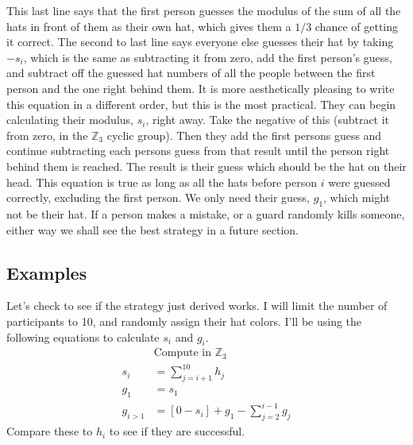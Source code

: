 \documentclass[10pt]{article}
\begin{document}
This last line says that the first person guesses the 
modulus of the sum of all the hats in front of them as their own hat, which 
gives them a $1/3$ chance of getting it correct. The second to last 
line says everyone else guesses their hat by taking $-s_i$, which is the same 
as subtracting it from zero, add the first person's guess, and subtract 
off the guessed hat numbers of all the people between the first person 
and the one right behind them. It is more aesthetically pleasing to 
write this equation in a different order, but this is the most practical. 
They can begin calculating their modulus, $s_i$, right away. Take the 
negative of this (subtract it from zero, in the $\mathbb{Z}_3$ 
cyclic group). Then they add the first persons guess and continue 
subtracting each persons guess from that result until 
the person right behind them is reached. The result is their guess which 
should be the hat on their head. This equation is true as long as all the 
hats before person $i$ were guessed correctly, excluding the first person. 
We only need their guess, $g_1$, which might not be their hat.
If a person makes a mistake, or a guard randomly kills 
someone, either way we shall see the best strategy in a future section. 

\subsection{Examples}

Let's check to see if the strategy just derived works. I will
limit the number of participants to 10, and randomly assign their 
hat colors. I'll be using the following equations to calculate $s_i$ and 
$g_i$.
\begin{align*}
    &\text{Compute in $\mathbb{Z}_3$} \\
    s_i &= \sum_{j=i+1}^{10} h_j \\
    g_1 &= s_1 \\
    g_{i>1} &= [0-s_i] + g_1 - \sum_{j=2}^{i-1}g_j
\end{align*}
Compare these to $h_i$ to see if they are successful.
\end{document}
